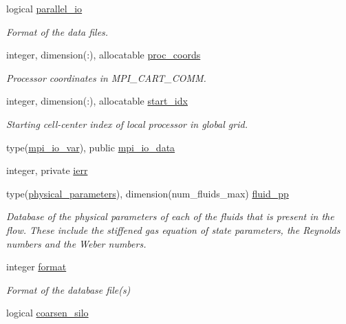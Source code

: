 \begin{DoxyCompactItemize}
logical \hyperlink{namespacem__global__parameters_ac127ac2a9036e1cdb7e6c41159cacdfb}{parallel\+\_\+io}
\begin{DoxyCompactList}\small\item\em Format of the data files. \end{DoxyCompactList}\item 
integer, dimension(\+:), allocatable \hyperlink{namespacem__global__parameters_a48dea2bc17c5e4465a444c926070ae9b}{proc\+\_\+coords}
\begin{DoxyCompactList}\small\item\em Processor coordinates in M\+P\+I\+\_\+\+C\+A\+R\+T\+\_\+\+C\+O\+MM. \end{DoxyCompactList}\item 
integer, dimension(\+:), allocatable \hyperlink{namespacem__global__parameters_a4bd117ae744eab60f3d681fd03d6e90d}{start\+\_\+idx}
\begin{DoxyCompactList}\small\item\em Starting cell-\/center index of local processor in global grid. \end{DoxyCompactList}\item 
type(\hyperlink{structm__derived__types_1_1mpi__io__var}{mpi\+\_\+io\+\_\+var}), public \hyperlink{namespacem__global__parameters_ad80f68aac31aa898ab2d7729f60e375f}{mpi\+\_\+io\+\_\+data}
\item 
integer, private \hyperlink{namespacem__global__parameters_a46461347b5094736adfa94ef005b49a6}{ierr}
\item 
type(\hyperlink{structm__derived__types_1_1physical__parameters}{physical\+\_\+parameters}), dimension(num\+\_\+fluids\+\_\+max) \hyperlink{namespacem__global__parameters_a7297abec8863ecabf95e24ebdae46a17}{fluid\+\_\+pp}
\begin{DoxyCompactList}\small\item\em Database of the physical parameters of each of the fluids that is present in the flow. These include the stiffened gas equation of state parameters, the Reynolds numbers and the Weber numbers. \end{DoxyCompactList}\item 
integer \hyperlink{namespacem__global__parameters_a35560eae3e70f3a803a78c590bce1e13}{format}
\begin{DoxyCompactList}\small\item\em Format of the database file(s) \end{DoxyCompactList}\item 
logical \hyperlink{namespacem__global__parameters_a2db51a0beed308d7a3c51c5c0ed45609}{coarsen\+\_\+silo}

\end{DoxyCompactItemize}
